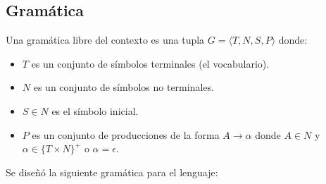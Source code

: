 \subsection{Gramática}

Una gramática libre del contexto es una tupla $G = \langle T, N, S, P \rangle$ donde:

\begin{itemize}
        \item $T$ es un conjunto de símbolos terminales (el vocabulario).
        \item $N$ es un conjunto de símbolos no terminales.
        \item $S \in N$ es el símbolo inicial.
        \item $P$ es un conjunto de producciones de la forma $A \rightarrow \alpha$  donde $A \in N$ y $\alpha \in \{T \times N\}^+$ o $\alpha = \epsilon$.
\end{itemize}

Se diseñó la siguiente gramática para el lenguaje:

